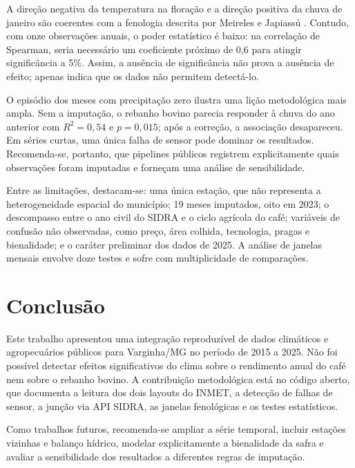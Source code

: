 \documentclass{RITA}
\begin{document}
A dire\c{c}\~ao negativa da temperatura na flora\c{c}\~ao e a dire\c{c}\~ao positiva da chuva de janeiro s\~ao coerentes com a fenologia descrita por Meireles e Japiass\'u \cite{meireles2009}. Contudo, com onze observa\c{c}\~oes anuais, o poder estat\'istico \'e baixo: na correla\c{c}\~ao de Spearman, seria necess\'ario um coeficiente pr\'oximo de 0,6 para atingir signific\^ancia a 5\%. Assim, a aus\^encia de signific\^ancia n\~ao prova a aus\^encia de efeito; apenas indica que os dados n\~ao permitem detect\'a-lo.

O epis\'odio dos meses com precipita\c{c}\~ao zero ilustra uma li\c{c}\~ao metodol\'ogica mais ampla. Sem a imputa\c{c}\~ao, o rebanho bovino parecia responder \`a chuva do ano anterior com $R^2=0{,}54$ e $p=0{,}015$; ap\'os a corre\c{c}\~ao, a associa\c{c}\~ao desapareceu. Em s\'eries curtas, uma \'unica falha de sensor pode dominar os resultados. Recomenda-se, portanto, que pipelines p\'ublicos registrem explicitamente quais observa\c{c}\~oes foram imputadas e forne\c{c}am uma an\'alise de sensibilidade.

Entre as limita\c{c}\~oes, destacam-se: uma \'unica esta\c{c}\~ao, que n\~ao representa a heterogeneidade espacial do munic\'ipio; 19 meses imputados, oito em 2023; o descompasso entre o ano civil do SIDRA e o ciclo agr\'icola do caf\'e; vari\'aveis de confus\~ao n\~ao observadas, como pre\c{c}o, \'area colhida, tecnologia, pragas e bienalidade; e o car\'ater preliminar dos dados de 2025. A an\'alise de janelas mensais envolve doze testes e sofre com multiplicidade de compara\c{c}\~oes.

\section{Conclus\~ao}

Este trabalho apresentou uma integra\c{c}\~ao reproduz\'ivel de dados clim\'aticos e agropecu\'arios p\'ublicos para Varginha/MG no per\'iodo de 2015 a 2025. N\~ao foi poss\'ivel detectar efeitos significativos do clima sobre o rendimento anual do caf\'e nem sobre o rebanho bovino. A contribui\c{c}\~ao metodol\'ogica est\'a no c\'odigo aberto, que documenta a leitura dos dois layouts do INMET, a detec\c{c}\~ao de falhas de sensor, a jun\c{c}\~ao via API SIDRA, as janelas fenol\'ogicas e os testes estat\'isticos.

Como trabalhos futuros, recomenda-se ampliar a s\'erie temporal, incluir esta\c{c}\~oes vizinhas e balan\c{c}o h\'idrico, modelar explicitamente a bienalidade da safra e avaliar a sensibilidade dos resultados a diferentes regras de imputa\c{c}\~ao.
\end{document}
